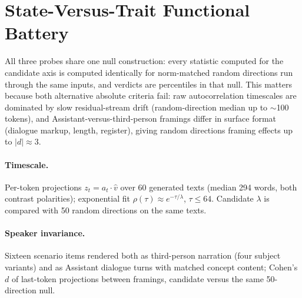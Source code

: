 \documentclass[10pt,twocolumn]{article}
\begin{document}

\section{State-Versus-Trait Functional Battery}
\label{app:state-trait}

All three probes share one null construction: every statistic computed for
the candidate axis is computed identically for norm-matched random directions
run through the same inputs, and verdicts are percentiles in that null. This
matters because both alternative absolute criteria fail: raw autocorrelation
timescales are dominated by slow residual-stream drift (random-direction
median up to $\sim$100 tokens), and Assistant-versus-third-person framings
differ in surface format (dialogue markup, length, register), giving random
directions framing effects up to $|d| \approx 3$.

\paragraph{Timescale.}
Per-token projections $z_t = a_t \cdot \hat{v}$ over 60 generated texts
(median 294 words, both contrast polarities); exponential fit
$\rho(\tau) \approx e^{-\tau/\lambda}$, $\tau \le 64$. Candidate $\lambda$
is compared with 50 random directions on the same texts.

\paragraph{Speaker invariance.}
Sixteen scenario items rendered both as third-person narration (four subject
variants) and as Assistant dialogue turns with matched concept content;
Cohen's $d$ of last-token projections between framings, candidate versus the
same 50-direction null.
\end{document}

